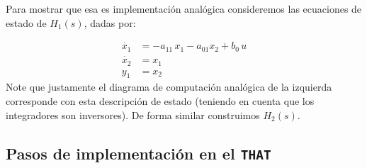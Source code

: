 \documentclass[]{scrartcl}
\newcommand{\tt}[1]{\texttt{#1}}
\begin{document}
Para mostrar que esa es implementación analógica consideremos las ecuaciones de estado de $H_1(s)$, dadas por: 

\begin{align}
	\dot{x_1}&= -a_{11}\,x_1 - a_{01} x_2 + b_0\,u\nonumber\\
	\dot{x_2}&= x_1\nonumber\\
	y_1&=x_2
\end{align}
Note que justamente el diagrama de computación analógica de la izquierda corresponde con esta descripción de estado (teniendo en cuenta que los integradores son inversores). De forma similar construimos $H_2(s)$.


\subsection{Pasos de implementación en el \tt{THAT}}
\end{document}
